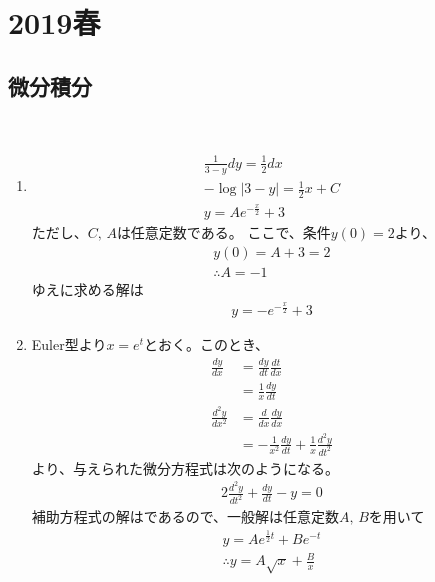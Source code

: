 \section{2019春}

\setcounter{yearcounter}{2019}


\subsection{微分積分}
\begin{ans*}
  ${}$
  \begin{enumerate}[label=(\alph*)]
    \item %
    \begin{gather}
      \frac{1}{3-y}dy = \frac{1}{2}dx \\
      -\log|3-y| = \frac{1}{2}x + C \\
      y = Ae^{-\frac{x}{2}} + 3
    \end{gather}
    ただし、$C,\,A$は任意定数である。
    ここで、条件$y(0) = 2$より、
    \begin{gather}
      y(0) = A + 3 = 2 \\
      \therefore  A = -1
    \end{gather}
    ゆえに求める解は
    \begin{gather}
      y = -e^{-\frac{x}{2}} + 3
    \end{gather}
    \item Euler型より$x = e^t$とおく。このとき、
    \begin{align}
      \frac{dy}{dx}
        &= \frac{dy}{dt}\frac{dt}{dx} \\
        &= \frac{1}{x}\frac{dy}{dt} \\
      \frac{d^2y}{dx^2}
        &= \frac{d}{dx}\frac{dy}{dx} \\
        &= -\frac{1}{x^2}\frac{dy}{dt} + \frac{1}{x}\frac{d^2y}{dt^2}
    \end{align}
    より、与えられた微分方程式は次のようになる。
    \begin{align}
      2\frac{d^2y}{dt^2} + \frac{dy}{dt} - y = 0
    \end{align}
    補助方程式の解はであるので、一般解は任意定数$A,\,B$を用いて
    \begin{gather}
      y = Ae^{\frac{1}{2}t} + Be^{-t} \\
      \therefore y = A\sqrt{x} + \frac{B}{x}
    \end{gather}
  \end{enumerate}
\end{ans*}


